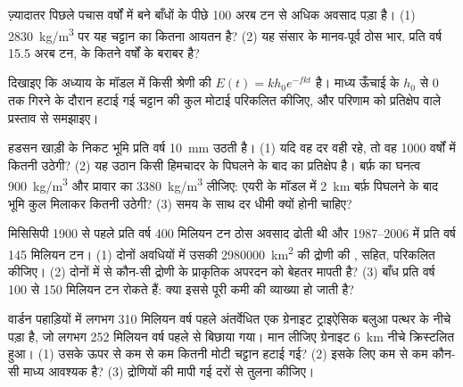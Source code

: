 \begin{exercise}[$\star\star$]\label{exo:g12:destruction-of-mountains:11}
ज़्यादातर पिछले पचास वर्षों में बने बाँधों के पीछे 100 अरब टन से अधिक अवसाद
पड़ा है। (1) \qty{2830}{kg/m^3} पर यह चट्टान का कितना आयतन है?
(2) यह संसार के मानव-पूर्व ठोस भार, प्रति वर्ष 15.5 अरब टन,
के कितने वर्षों के बराबर है?
\end{exercise}

\begin{exercise}[$\star\star\star$]\label{exo:g12:destruction-of-mountains:12}
दिखाइए कि अध्याय के मॉडल में किसी श्रेणी की 
$E(t) = k h_0 e^{-fkt}$ है। माध्य ऊँचाई के $h_0$ से 0 तक गिरने के दौरान
हटाई गई चट्टान की कुल मोटाई परिकलित कीजिए, और परिणाम को
प्रतिक्षेप वाले प्रस्ताव से समझाइए।
\end{exercise}

\begin{exercise}[$\star\star\star$]\label{exo:g12:destruction-of-mountains:13}
हडसन खाड़ी के निकट भूमि प्रति वर्ष \qty{10}{mm} उठती है। (1) यदि वह दर
वही रहे, तो वह 1000 वर्षों में कितनी उठेगी? (2) यह उठान किसी हिमचादर के पिघलने के बाद का
प्रतिक्षेप है। बर्फ़ का घनत्व
\qty{900}{kg/m^3} और प्रावार का \qty{3380}{kg/m^3} लीजिए: एयरी के मॉडल में
\qty{2}{km} बर्फ़ पिघलने के बाद भूमि कुल मिलाकर कितनी उठेगी?
(3) समय के साथ दर धीमी क्यों होनी चाहिए?
\end{exercise}

\begin{exercise}[$\star\star\star$]\label{exo:g12:destruction-of-mountains:14}
मिसिसिपी 1900 से पहले प्रति वर्ष 400 मिलियन टन ठोस अवसाद ढोती थी
और 1987--2006 में प्रति वर्ष 145 मिलियन टन। (1) दोनों अवधियों में
उसकी \qty{2980000}{km^2} की द्रोणी की ,  सहित,
परिकलित कीजिए। (2) दोनों में से कौन-सी द्रोणी के प्राकृतिक अपरदन को बेहतर
मापती है? (3) बाँध प्रति वर्ष 100 से 150 मिलियन टन रोकते हैं: क्या इससे
पूरी कमी की व्याख्या हो जाती है?
\end{exercise}

\begin{exercise}[$\star\star\star$]\label{exo:g12:destruction-of-mountains:15}
वार्डन पहाड़ियों में लगभग 310 मिलियन वर्ष पहले अंतर्वेधित एक ग्रेनाइट
ट्राइऐसिक बलुआ पत्थर के नीचे पड़ा है, जो लगभग 252 मिलियन वर्ष पहले से बिछाया गया।
मान लीजिए ग्रेनाइट \qty{6}{km} नीचे क्रिस्टलित हुआ। (1) उसके ऊपर से कम से कम
कितनी मोटी चट्टान हटाई गई? (2) इसके लिए कम से कम कौन-सी माध्य 
आवश्यक है? (3) द्रोणियों की मापी गई दरों से तुलना कीजिए।
\end{exercise}

